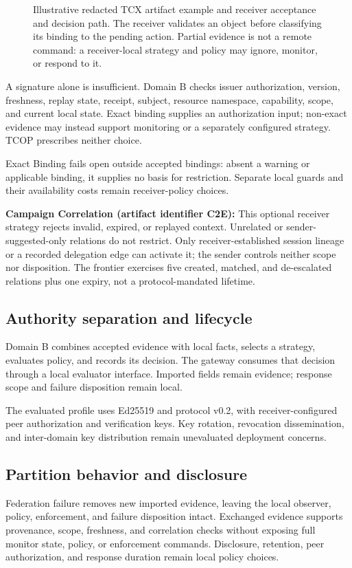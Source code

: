 \begin{figure}[t]
{{}}
\caption{Illustrative redacted TCX artifact example and receiver acceptance and decision path. The receiver validates an object before classifying its binding to the pending action. Partial evidence is not a remote command: a receiver-local strategy and policy may ignore, monitor, or respond to it.}
\label{fig:tcx-acceptance}
\end{figure}

A signature alone is insufficient. Domain B checks issuer authorization, version, freshness, replay state, receipt, subject, resource namespace, capability, scope, and current local state. Exact binding supplies an authorization input; non-exact evidence may instead support monitoring or a separately configured strategy. TCOP prescribes neither choice.

Exact Binding fails open outside accepted bindings: absent a warning or applicable binding, it supplies no basis for restriction. Separate local guards and their availability costs remain receiver-policy choices.

\noindent\textbf{Campaign Correlation (artifact identifier C2E):} This optional receiver strategy rejects invalid, expired, or replayed context. Unrelated or sender-suggested-only relations do not restrict. Only receiver-established session lineage or a recorded delegation edge can activate it; the sender controls neither scope nor disposition. The frontier exercises five created, matched, and de-escalated relations plus one expiry, not a protocol-mandated lifetime.

\subsection{Authority separation and lifecycle}

Domain B combines accepted evidence with local facts, selects a strategy, evaluates policy, and records its decision. The gateway consumes that decision through a local evaluator interface. Imported fields remain evidence; response scope and failure disposition remain local.

The evaluated profile uses Ed25519 and protocol v0.2, with receiver-configured peer authorization and verification keys. Key rotation, revocation dissemination, and inter-domain key distribution remain unevaluated deployment concerns.



\subsection{Partition behavior and disclosure}

Federation failure removes new imported evidence, leaving the local observer, policy, enforcement, and failure disposition intact. Exchanged evidence supports provenance, scope, freshness, and correlation checks without exposing full monitor state, policy, or enforcement commands. Disclosure, retention, peer authorization, and response duration remain local policy choices.


